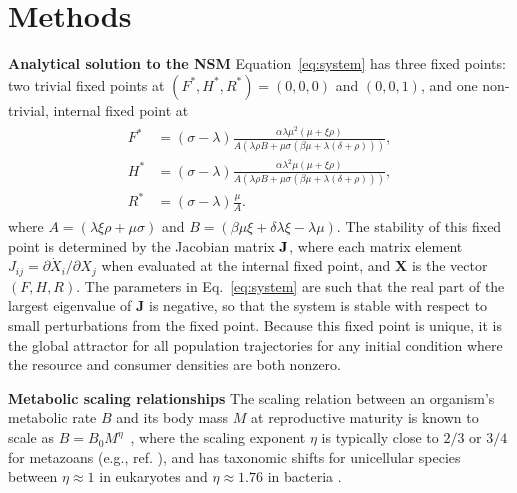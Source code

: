 \documentclass[twocolumn,preprintnumbers,amsmath,amssymb,superscriptaddress]{revtex4}
\begin{document}
\section*{Methods}
\small{
{\bf Analytical solution to the NSM}
Equation~\eqref{eq:system} has three fixed points: two trivial fixed points at $(F^*,H^*,R^*)=(0,0,0)$ and $(0,0,1)$, and one non-trivial, internal fixed point at
\begin{align}
\label{eq:ss}
\begin{split}
F^* &= (\sigma-\lambda)\frac{ \alpha  \lambda  \mu ^2  (\mu +\xi  \rho )}{A (\lambda  \rho  B+\mu  \sigma  (\beta  \mu +\lambda  (\delta +\rho )))}, \\
H^* &= (\sigma-\lambda)\frac{ \alpha  \lambda ^2 \mu  (\mu +\xi  \rho )}{A (\lambda  \rho  B+\mu  \sigma  (\beta  \mu +\lambda  (\delta +\rho )))}, \\
R^* &= (\sigma - \lambda)\frac{\mu  }{A}.
\end{split}
\end{align}
where $A=(\lambda  \xi  \rho +\mu  \sigma )$ and $B=(\beta  \mu  \xi +\delta  \lambda  \xi -\lambda  \mu )$. The stability of this fixed point is determined by the Jacobian matrix $\bf J$, where each matrix element $J_{ij}=\partial{\dot X_i}/\partial{X_j}$ when evaluated at the internal fixed point, and $\mathbf{X}$ is the vector $(F,H,R)$.
The parameters in Eq.~\eqref{eq:system} are such that the real part of the largest eigenvalue of $\mathbf{J}$ is negative, so that the system is stable with respect to small perturbations from the fixed point.
Because this fixed point is unique, it is the global attractor for all population trajectories for any initial condition where the resource and consumer densities are both nonzero.

{\bf Metabolic scaling relationships}
The scaling relation between an organism's metabolic
rate $B$ and its body mass $M$ at reproductive maturity is known to scale as
$B = B_0 M^\eta$~\citep{West:2002it}, where the scaling exponent $\eta$ is
typically close to $2/3$ or $3/4$ for metazoans (e.g., ref. \citep{Brown:2004wq}),
and has taxonomic shifts for unicellular species between $\eta\approx 1$ in
eukaryotes and $\eta\approx 1.76$ in bacteria
\citep{DeLong:2010dy,Kempes:2012hy}.

}
\end{document}
